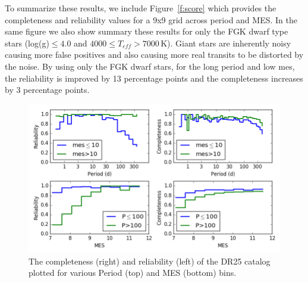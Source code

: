 To summarize these results, we include Figure~\ref{f:score} which provides the completeness and reliability values for a 9x9 grid across period and MES. In the same figure we also show summary these results for only the FGK dwarf type stars (log(g)$\leq4.0$ and $4000 \leq T_{eff} > 7000$\,K). Giant stars are inherently noisy causing more false positives and also causing more real transits to be distorted by the noise.  By using only the FGK dwarf stars, for the long period and low mes, the reliability is improved by 13 percentage points  and the completeness increases by 3 percentage points.


\begin{figure}[h!]
 \begin{center}
  \includegraphics[width=1.0\linewidth]{fig-compRel1D-PerMes.png}
  \caption{\label{f:1dcomparel} The completeness (right) and reliability (left) of the DR25 catalog plotted for various Period (top) and MES (bottom) bins.}
 \end{center}
 \end{figure}


